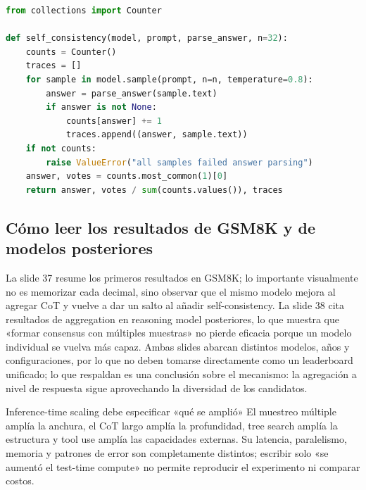 \begin{lstlisting}[language=Python,caption={Agregación de self-consistency exact-answer}]
from collections import Counter

def self_consistency(model, prompt, parse_answer, n=32):
    counts = Counter()
    traces = []
    for sample in model.sample(prompt, n=n, temperature=0.8):
        answer = parse_answer(sample.text)
        if answer is not None:
            counts[answer] += 1
            traces.append((answer, sample.text))
    if not counts:
        raise ValueError("all samples failed answer parsing")
    answer, votes = counts.most_common(1)[0]
    return answer, votes / sum(counts.values()), traces
\end{lstlisting}

\subsection{Cómo leer los resultados de GSM8K y de modelos posteriores}

La slide 37 resume los primeros resultados en GSM8K; lo importante visualmente no es memorizar cada decimal, sino observar que el mismo modelo mejora al agregar CoT y vuelve a dar un salto al añadir self-consistency. La slide 38 cita resultados de aggregation en reasoning model posteriores, lo que muestra que «formar consensus con múltiples muestras» no pierde eficacia porque un modelo individual se vuelva más capaz. Ambas slides abarcan distintos modelos, años y configuraciones, por lo que no deben tomarse directamente como un leaderboard unificado; lo que respaldan es una conclusión sobre el mecanismo: la agregación a nivel de respuesta sigue aprovechando la diversidad de los candidatos.



\begin{warningbox}{Inference-time scaling debe especificar «qué se amplió»}
El muestreo múltiple amplía la anchura, el CoT largo amplía la profundidad, tree search amplía la estructura y tool use amplía las capacidades externas. Su latencia, paralelismo, memoria y patrones de error son completamente distintos; escribir solo «se aumentó el test-time compute» no permite reproducir el experimento ni comparar costos.
\end{warningbox}

